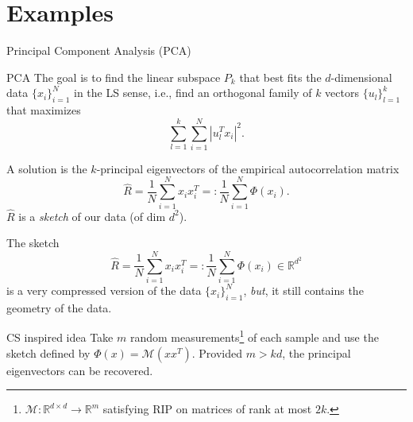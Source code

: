 \section{Examples}
\begin{frame}{Principal Component Analysis (PCA)}
	\begin{block}{PCA}
		The goal is to find the linear subspace $P_k$ that best fits the $d$-dimensional data $\{x_i\}_{i=1}^N$ in the LS sense, i.e., find an orthogonal family of $k$ vectors $\{u_l\}_{l=1}^k$ that maximizes
		\begin{equation*}
				\sum_{l=1}^k\sum_{i=1}^N |u_l^Tx_i|^2.
		\end{equation*}
	\end{block}
	A solution is the $k$-principal eigenvectors of the empirical autocorrelation matrix
	\begin{equation*}
		\hat{R} = \frac{1}{N}\sum_{i=1}^N x_ix_i^T =: \frac{1}{N}\sum_{i=1}^N \Phi(x_i).
	\end{equation*}
	$\hat{R}$ is a \emph{sketch} of our data (of dim $d^2$).
\end{frame}


\begin{frame}
	The sketch 
	\begin{equation*}
		\hat{R} = \frac{1}{N}\sum_{i=1}^N x_ix_i^T =: \frac{1}{N}\sum_{i=1}^N \Phi(x_i) \in \mathbb{R}^{d^2}
	\end{equation*}
 	is a very compressed version of the data $\{x_i\}_{i=1}^N$, \emph{but}, it still contains the geometry of the data.
	\begin{block}{CS inspired idea}
		Take $m$ random measurements\footnote{$\mathcal{M}:\mathbb{R}^{d\times d}\to \mathbb{R}^m$ satisfying RIP on matrices of rank at most $2k$.} of each sample and use the sketch defined by $\Phi(x) = \mathcal{M}(xx^T)$. Provided $m>kd$, the principal eigenvectors can be recovered.
	\end{block}

\end{frame}